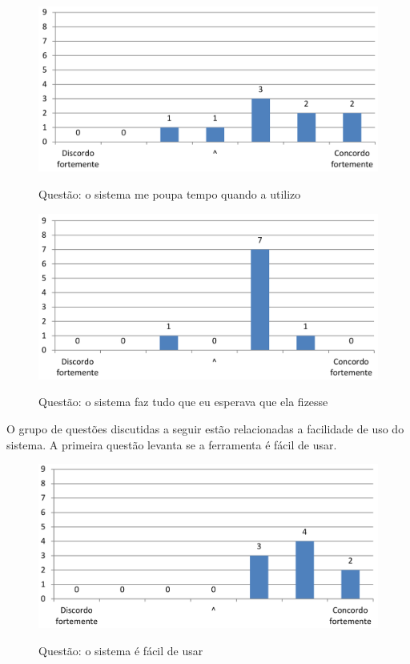 \begin{figure}[ht]
\centering
\caption{Questão: o sistema me poupa tempo quando a utilizo}
\includegraphics[width=1.0\textwidth]{use/poupa_tempo.pdf} 
\label{fig:poupa_tempo} 
\end{figure}


\begin{figure}[ht]
\centering
\caption{Questão: o sistema faz tudo que eu esperava que ela fizesse}
\includegraphics[width=1.0\textwidth]{use/faz_esperava.pdf} 
\label{fig:faz_esperava} 
\end{figure}

O grupo de questões discutidas a seguir estão relacionadas a facilidade de uso do sistema. A primeira questão levanta se a ferramenta é fácil de usar.


\begin{figure}[ht]
\centering
\caption{Questão: o sistema é fácil de usar}
\includegraphics[width=1.0\textwidth]{use/fu_facil_usar.pdf} 
\label{fig:fu_facil_usar} 
\end{figure}


